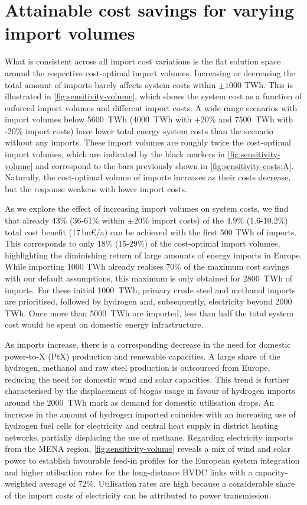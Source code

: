 \documentclass[5p,10pt]{elsarticle}
\newcommand{\bneuro}[1]{#1\,bn\euro{}/a}
\begin{document}
\section*{Attainable cost savings for varying import volumes} 

What is consistent across all import cost variations is the flat solution space
around the respective cost-optimal import volumes. Increasing or decreasing the
total amount of imports barely affects system costs within $\pm 1000$ TWh. This
is illustrated in \cref{fig:sensitivity-volume}, which shows the system cost as
a function of enforced import volumes and different import costs. A wide range
scenarios with import volumes below 5600~TWh (4000~TWh with +20\% and 7500~TWh
with -20\% import costs) have lower total energy system costs than the scenario
without any imports. These import volumes are roughly twice the cost-optimal
import volumes, which are indicated by the black markers in
\cref{fig:sensitivity-volume} and correspond to the bars previously shown in
\cref{fig:sensitivity-costs:A}. Naturally, the cost-optimal volume of imports
increases as their costs decrease, but the response weakens with lower import
costs.

As we explore the effect of increasing import volumes on system costs, we find
that already 43\% (36-61\% within $\pm$20\% import costs) of the 4.9\%
(1.6-10.2\%) total cost benefit (\bneuro{17}) can be achieved with the first 500
TWh of imports. This corresponds to only 18\% (15-29\%) of the cost-optimal
import volumes, highlighting the diminishing return of large amounts of energy
imports in Europe. While importing 1000 TWh already realises 70\% of the maximum
cost savings with our default assumptions, this maximum is only obtained for
2800~TWh of imports. For these initial 1000~TWh, primary crude steel and
methanol imports are prioritised, followed by hydrogen and, subsequently,
electricity beyond 2000 TWh. Once more than 5000~TWh are imported, less than
half the total system cost would be spent on domestic energy infrastructure.

As imports increase, there is a corresponding decrease in the need for domestic
power-to-X (PtX) production and renewable capacities. A large share of the
hydrogen, methanol and raw steel production is outsourced from Europe, reducing
the need for domestic wind and solar capacities. This trend is further
characterised by the displacement of biogas usage in favour of hydrogen imports
around the 2000~TWh mark as demand for domestic  utilisation drops. An
increase in the amount of hydrogen imported coincides with an increasing use of
hydrogen fuel cells for electricity and central heat supply in district heating
networks, partially displacing the use of methane. Regarding electricity imports
from the MENA region, \cref{fig:sensitivity-volume} reveals a mix of wind and
solar power to establish favourable feed-in profiles for the European system
integration and higher utilisation rates for the long-distance HVDC links with a
capacity-weighted average of 72\%. Utilisation rates are high because a
considerable share of the import costs of electricity can be attributed to power
transmission.
\end{document}

